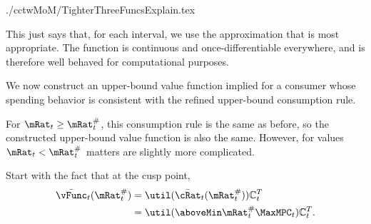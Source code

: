 \documentclass[titlepage]{\econtex}
\begin{document}
\begin{verbatimwrite}{./cctwMoM/TighterThreeFuncsExplain.tex}

  This just says that, for each interval, we use the approximation that
  is most appropriate.  The function is continuous and
  once-differentiable everywhere, and is therefore well behaved for
  computational purposes.

  We now construct an upper-bound value function implied for a consumer whose spending behavior
  is consistent with the refined upper-bound consumption rule.  

  For $\mRat_{t} \geq \mRat_{t}^{\#}$, this consumption rule is the same as before,
  so the constructed upper-bound value function is also the same.  However, for 
  values $\mRat_{t} < \mRat_{t}^{\#}$ matters are slightly more complicated.  

  Start with the fact that at the cusp point, 
  \begin{equation*}\begin{gathered}\begin{aligned}
    \bar{\vFunc}_{t}(\mtCusp)  & = \util(\bar{\cRat}_{t}(\mtCusp))\mathbb{C}_{t}^{T} \\
                               & =  \util(\aboveMin \mtCusp  \MaxMPC_{t})\mathbb{C}_{t}^{T}
                                  .
  \end{aligned}\end{gathered}\end{equation*}


\end{verbatimwrite}
\end{document}

